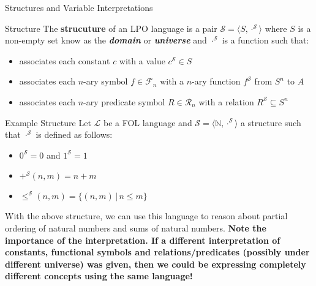 \documentclass[aspectratio=169]{beamer}
\begin{document}
\begin{slide}{Structures and Variable Interpretations}

\begin{block}{Structure}
The {\bf strucuture} of an LPO language is a pair $\mathcal{S} = \langle S, \cdot^\mathcal{S} \rangle$ where $S$ is a non-empty set know as the \textbf{\textit{domain}} or \textbf{\textit{universe}} and $\cdot^\mathcal{S}$ is a function such that:
\begin{itemize}
  \item associates each constant $c$ with a value $c^\mathcal{S} \in S$
  \item associates each $n$-ary symbol $f \in \mathcal{F}_n$ with a $n$-ary function $f^\mathcal{S}$ from $S^n$ to $A$
  \item associates each $n$-ary predicate symbol $R \in \mathcal{R}_n$ with a relation $R^\mathcal{S} \subseteq S^n$
\end{itemize}
\end{block}
\end{slide}

\begin{slide}{Example Structure}
Let $\mathcal{L}$ be a FOL language and $\mathcal{S} = \langle \mathbb{N},\cdot^\mathcal{S} \rangle$ a structure such that $\cdot^\mathcal{S}$ is defined as follows:
\begin{itemize}
  \item $0^\mathcal{S} = 0$ and $1^\mathcal{S} = 1$
  \item $+^\mathcal{S}(n,m) = n + m$
  \item $\leq^\mathcal{S}(n,m) = \{ (n,m) \,|\, n \leq m \}$
\end{itemize}
With the above structure, we can use this language to reason about partial ordering of natural numbers and sums of natural numbers. {\bf Note the importance of the interpretation. If a different interpretation of constants, functional symbols and relations/predicates (possibly under different universe) was given, then we could be expressing completely different concepts using the same language!}
\end{slide}
\end{document}
